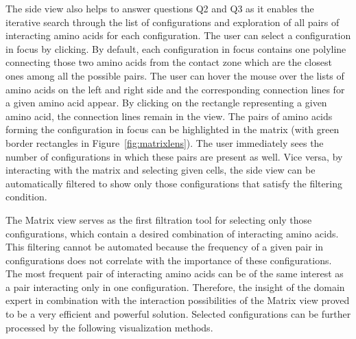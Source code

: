 \documentclass{bmcart}
\def\MatView {Matrix view\xspace}
\begin{document}
The side view also helps to answer questions Q2 and Q3 as it enables the iterative search through the list of configurations and exploration of all pairs of interacting amino acids for each configuration.
The user can select a configuration in focus by clicking. 
By default, each configuration in focus contains one polyline connecting those two amino acids from the contact zone which are the closest ones among all the possible pairs.
The user can hover the mouse over the lists of amino acids on the left and right side and the corresponding connection lines for a given amino acid appear.
By clicking on the rectangle representing a given amino acid, the connection lines remain in the view. 
The pairs of amino acids forming the configuration in focus can be highlighted in the matrix (with green border rectangles in Figure~\ref{fig:matrixlens}).
The user immediately sees the number of configurations in which these pairs are present as well.
Vice versa, by interacting with the matrix and selecting given cells, the side view can be automatically filtered to show only those configurations that satisfy the filtering condition.

The \MatView serves as the first filtration tool for selecting only those configurations, which contain a desired combination of interacting amino acids.
This filtering cannot be automated because the frequency of a given pair in configurations does not correlate with the importance of these configurations.
The most frequent pair of interacting amino acids can be of the same interest as a pair interacting only in one configuration.
Therefore, the insight of the domain expert in combination with the interaction possibilities of the \MatView proved to be a very efficient and powerful solution.
Selected configurations can be further processed by the following visualization methods.


\end{document}
